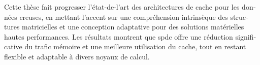 \begin{otherlanguage}{french}
Cette thèse fait progresser l'état-de-l'art des architectures de cache pour les données creuses, en mettant l'accent sur une compréhension intrinsèque des structures matricielles et une conception adaptative pour des solutions matérielles hautes performances.
Les résultats montrent que \acrlong{spdc} offre une réduction significative du trafic mémoire et une meilleure utilisation du cache, tout en restant flexible et adaptable à divers noyaux de calcul.


\end{otherlanguage}
\renewcommand{\thesection}{\arabic{chapter}.\arabic{section}}

\cleardoublepage %
